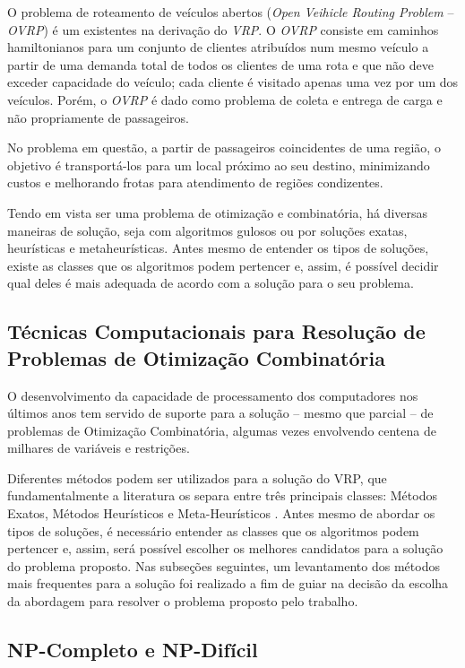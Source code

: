 O problema de roteamento de veículos abertos (\emph{Open Veihicle Routing Problem} -- \emph{OVRP}) é um existentes na derivação do \emph{VRP}. O \emph{OVRP} consiste em caminhos hamiltonianos para um conjunto de clientes atribuídos num mesmo veículo a partir de uma demanda total de todos os clientes de uma rota e que não deve exceder capacidade do veículo; cada cliente é visitado apenas uma vez por um dos veículos. Porém, o \emph{OVRP} é dado como problema de coleta e entrega de carga e não propriamente de passageiros.

No problema em questão, a partir de passageiros coincidentes de uma região, o objetivo é transportá-los para um local próximo ao seu destino, minimizando custos e melhorando frotas para atendimento de regiões condizentes. 

Tendo em vista ser uma problema de otimização e combinatória, há diversas maneiras de solução, seja com algoritmos gulosos ou por soluções exatas, heurísticas e metaheurísticas. Antes mesmo de entender os tipos de soluções, existe as classes que os algoritmos podem pertencer e, assim, é possível decidir qual deles é mais adequada de acordo com a solução para o seu problema.

\subsection{Técnicas Computacionais para Resolução de Problemas de Otimização Combinatória}
\label{tecnicas-computacionais}
O desenvolvimento da capacidade de processamento dos computadores nos últimos anos tem servido de suporte para a solução -- mesmo que parcial -- de problemas de Otimização Combinatória, algumas vezes envolvendo centena de milhares de variáveis e restrições.

Diferentes métodos podem ser utilizados para a solução do VRP, que fundamentalmente a literatura os separa entre três principais classes: Métodos Exatos, Métodos Heurísticos e Meta-Heurísticos \cite{maxwell}. Antes mesmo de abordar os tipos de soluções, é necessário entender as classes que os algoritmos podem pertencer e, assim, será possível escolher os melhores candidatos para a solução do problema proposto. Nas subseções seguintes, um levantamento dos métodos mais frequentes para a solução foi realizado a fim de guiar na decisão da escolha da abordagem para resolver o problema proposto pelo trabalho.

\subsection{NP-Completo e NP-Difícil}
\label{classes-np}

